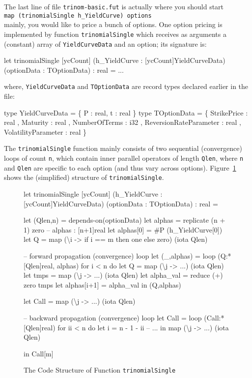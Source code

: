 \documentclass[a4paper,11pt]{article}
\begin{document}
The last line of file {\tt trinom-basic.fut} is actually where you should
start\\
{\tt map (trinomialSingle h\_YieldCurve) options}\\
mainly, you would like to price a bunch of options. One option pricing is 
implemented by function {\tt trinomialSingle} which receives as arguments a
(constant) array of {\tt YieldCurveData} and an option; its signature is:  
%
\begin{fancycode}
let trinomialSingle [ycCount] (h_YieldCurve : [ycCount]YieldCurveData)
                              (optionData   : TOptionData)
                            : real = ...
\end{fancycode}
\noindent where, {\tt YieldCurveData} and {\tt TOptionData} are record types
declared earlier in the file:
%
\begin{fancycode}
type YieldCurveData = \{ P : real, t : real \}
type TOptionData = \{
    StrikePrice   : real  
  , Maturity      : real  
  , NumberOfTerms : i32   
  , ReversionRateParameter : real 
  , VolatilityParameter    : real
\}
\end{fancycode}

The {\tt trinomialSingle} function mainly consists of two sequential 
(convergence) loops of count {\tt n}, which contain inner parallel
operators of length {\tt Qlen}, where {\tt n} and {\tt Qlen} are specific
to each option (and thus vary across options).   Figure~\ref{fig:code-struct} 
shows the (simplified) structure of {\tt trinomialSingle}.

\begin{figure}[h]
\begin{fancycode}[frame=lines]
let trinomialSingle [ycCount] (h_YieldCurve : [ycCount]YieldCurveData)
                              (optionData : TOptionData) : real =
    
    let (Qlen,n) = depends-on(optionData)
    let alphas = replicate (n + 1) zero  -- alphas : [n+1]real
    let alphas[0] = #P (h_YieldCurve[0])
    let Q = map (\textbackslash{}i -> if i == m then one else zero) (iota Qlen)

    -- forward propagation (convergence) loop
    let (_,alphas) =
        loop (Q:*[Qlen]real, alphas) for i < n do
            let Q         = map (\textbackslash{}j -> ...) (iota Qlen)
            let tmps      = map (\textbackslash{}j -> ...) (iota Qlen)
            let alpha_val = reduce (+) zero tmps
            let alphas[i+1] = alpha_val
            in  (Q,alphas)

    let Call = map (\textbackslash{}j -> ...) (iota Qlen)

    -- backward propagation (convergence) loop
    let Call =
        loop (Call:*[Qlen]real) for ii < n do
            let i = n - 1 - ii
            -- ...      
            in map (\textbackslash{}j -> ...) (iota Qlen)

    in Call[m]
\end{fancycode}
\vspace*{-3ex}
\caption{The Code Structure of Function {\tt trinomialSingle}}
\label{fig:code-struct} 
\end{figure}
\end{document}
